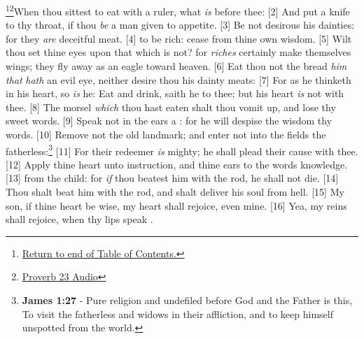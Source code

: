 \footnote{\textcolor[cmyk]{0.99998,1,0,0}{\hyperlink{TOC}{Return to end of Table of Contents.}}}\footnote{\href{https://audiobible.com/bible}{\textcolor[cmyk]{0.99998,1,0,0}{Proverb 23 Audio}}}\textcolor[cmyk]{0.99998,1,0,0}{When thou sittest to eat with a ruler,   what \emph{is} before thee:}
[2] \textcolor[cmyk]{0.99998,1,0,0}{And put a knife to thy throat, if thou \emph{be} a man given to appetite.}
[3] \textcolor[cmyk]{0.99998,1,0,0}{Be not desirous  his dainties: for they \emph{are} deceitful meat.}
[4] \textcolor[cmyk]{0.99998,1,0,0}{    to be rich: cease from thine own wisdom.}
[5] \textcolor[cmyk]{0.99998,1,0,0}{Wilt thou set thine eyes upon that which is not? for \emph{riches} certainly make themselves wings; they fly away as an eagle toward heaven.}
[6] \textcolor[cmyk]{0.99998,1,0,0}{Eat thou not the bread  \emph{him} \emph{that} \emph{hath} an evil eye, neither desire thou his dainty meats:}
[7] \textcolor[cmyk]{0.99998,1,0,0}{For as he thinketh in his heart, so \emph{is} he: Eat and drink, saith he to thee; but his heart \emph{is} not with thee.}
[8] \textcolor[cmyk]{0.99998,1,0,0}{The morsel \emph{which} thou hast eaten shalt thou vomit up, and lose thy sweet words.}
[9] \textcolor[cmyk]{0.99998,1,0,0}{Speak not in the ears  a  : for he will despise the wisdom  thy words.}
[10] \textcolor[cmyk]{0.99998,1,0,0}{Remove not the old landmark; and enter not into the fields  the fatherless:}\footnote{\textbf{James 1:27} - Pure religion and undefiled before God and the Father is this, To visit the fatherless and widows in their affliction, and to keep himself unspotted from the world.}
[11] \textcolor[cmyk]{0.99998,1,0,0}{For their redeemer \emph{is} mighty; he shall plead their cause with thee.}
[12] \textcolor[cmyk]{0.99998,1,0,0}{Apply thine heart unto instruction, and thine ears to the words  knowledge.}
[13] \textcolor[cmyk]{0.99998,1,0,0}{  from the child: for \emph{if} thou beatest him with the rod, he shall not die.}
[14] \textcolor[cmyk]{0.99998,1,0,0}{Thou shalt beat him with the rod, and shalt deliver his soul from hell.}
[15] \textcolor[cmyk]{0.99998,1,0,0}{My son, if thine heart be wise, my heart shall rejoice, even mine.}
[16] \textcolor[cmyk]{0.99998,1,0,0}{Yea, my reins shall rejoice, when thy lips speak  .}
